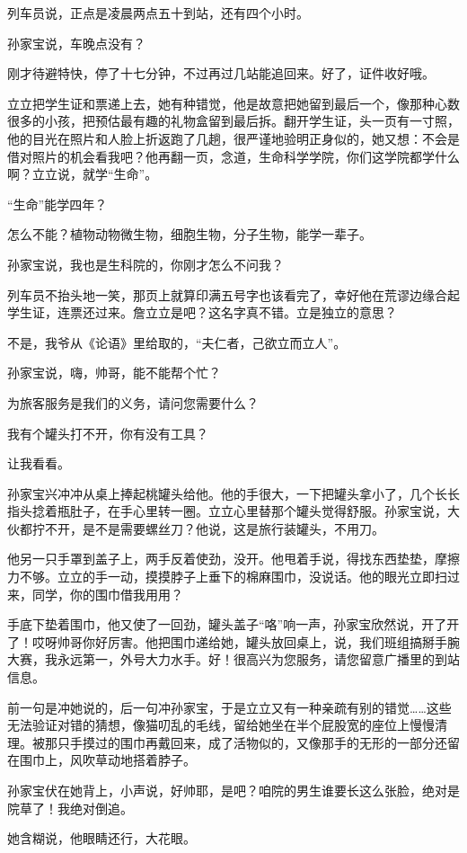 \documentclass[lang=cn,newtx,12pt,scheme=chinese]{elegantbook}
\begin{document}
列车员说，正点是凌晨两点五十到站，还有四个小时。

孙家宝说，车晚点没有？

刚才待避特快，停了十七分钟，不过再过几站能追回来。好了，证件收好哦。

立立把学生证和票递上去，她有种错觉，他是故意把她留到最后一个，像那种心数很多的小孩，把预估最有趣的礼物盒留到最后拆。翻开学生证，头一页有一寸照，他的目光在照片和人脸上折返跑了几趟，很严谨地验明正身似的，她又想：不会是借对照片的机会看我吧？他再翻一页，念道，生命科学学院，你们这学院都学什么啊？立立说，就学“生命”。

“生命”能学四年？

怎么不能？植物动物微生物，细胞生物，分子生物，能学一辈子。

孙家宝说，我也是生科院的，你刚才怎么不问我？

列车员不抬头地一笑，那页上就算印满五号字也该看完了，幸好他在荒谬边缘合起学生证，连票还过来。詹立立是吧？这名字真不错。立是独立的意思？

不是，我爷从《论语》里给取的，“夫仁者，己欲立而立人”。

孙家宝说，嗨，帅哥，能不能帮个忙？

为旅客服务是我们的义务，请问您需要什么？

我有个罐头打不开，你有没有工具？

让我看看。

孙家宝兴冲冲从桌上捧起桃罐头给他。他的手很大，一下把罐头拿小了，几个长长指头捻着瓶肚子，在手心里转一圈。立立心里替那个罐头觉得舒服。孙家宝说，大伙都拧不开，是不是需要螺丝刀？他说，这是旅行装罐头，不用刀。

他另一只手罩到盖子上，两手反着使劲，没开。他甩着手说，得找东西垫垫，摩擦力不够。立立的手一动，摸摸脖子上垂下的棉麻围巾，没说话。他的眼光立即扫过来，同学，你的围巾借我用用？

手底下垫着围巾，他又使了一回劲，罐头盖子“咯”响一声，孙家宝欣然说，开了开了！哎呀帅哥你好厉害。他把围巾递给她，罐头放回桌上，说，我们班组搞掰手腕大赛，我永远第一，外号大力水手。好！很高兴为您服务，请您留意广播里的到站信息。

前一句是冲她说的，后一句冲孙家宝，于是立立又有一种亲疏有别的错觉……这些无法验证对错的猜想，像猫叨乱的毛线，留给她坐在半个屁股宽的座位上慢慢清理。被那只手摸过的围巾再戴回来，成了活物似的，又像那手的无形的一部分还留在围巾上，风吹草动地搭着脖子。

孙家宝伏在她背上，小声说，好帅耶，是吧？咱院的男生谁要长这么张脸，绝对是院草了！我绝对倒追。

她含糊说，他眼睛还行，大花眼。
\end{document}

